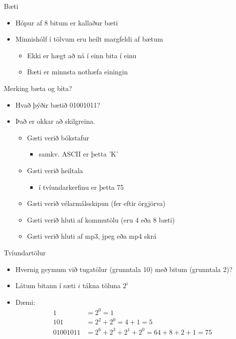 \documentclass[handout]{beamer}
\begin{document}
\begin{frame}{Bæti}
\begin{itemize}
 \item Hópur af 8 bitum er kallaður bæti
 \item Minnishólf í tölvum eru heilt margfeldi af bætum
 \begin{itemize}
  \item Ekki er hægt að ná í einn bita í einu
  \item Bæti er minnsta nothæfa einingin
 \end{itemize}
\end{itemize}
\end{frame}

\begin{frame}{Merking bæta og bita?}

\begin{itemize}
 \item  Hvað þýðir bætið 01001011? \pause
 \item Það er okkar að skilgreina.
 \begin{itemize}
  \item Gæti verið bókstafur
  \begin{itemize}
   \item samkv. ASCII er þetta 'K'
  \end{itemize}
   \item Gæti verið heiltala
  \begin{itemize}
   \item í tvíundarkerfinu er þetta 75
  \end{itemize}
  \item Gæti verið vélarmálsskipun (fer eftir örgjörva)
  \item Gæti verið hluti af kommutölu (eru 4 eða 8 bæti)
  \item Gæti verið hluti af mp3, jpeg eða mp4 skrá
 \end{itemize}
\end{itemize}
\end{frame}

\begin{frame}{Tvíundartölur}
\begin{itemize}
 \item Hvernig geymum við tugatölur (grunntala 10) með bitum (grunntala 2)? \pause
 \item Látum bitann í sæti $i$ tákna töluna $2^i$
 \item Dæmi:
\begin{align*}
1 		&=  2^0  	= 1\\
101		&=  2^2 + 2^0  =  4 + 1  =  5\\
01001011	&=  2^6 + 2^3 + 2^1 + 2^0  =  64 + 8 + 2 + 1 = 75
\end{align*}
\end{itemize}
\end{frame}
\end{document}
